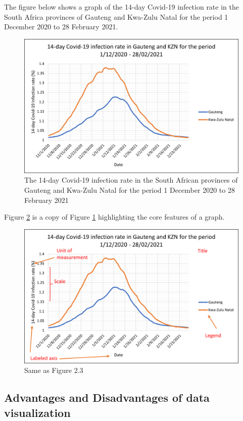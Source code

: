 \documentclass[
]{book}
\begin{document}
The figure below shows a graph of the 14-day Covid-19 infection rate in the South Africa provinces of Gauteng and Kwa-Zulu Natal for the period 1 December 2020 to 28 February 2021.

\begin{figure}

{\centering \includegraphics[width=0.7\linewidth]{Figures-Chapter1/Covid-1} 

}

\caption{The 14-day Covid-19 infection rate in the South African provinces of Gauteng and Kwa-Zulu Natal for the period 1 December 2020 to 28 February 2021}\label{fig:covid-1}
\end{figure}

Figure \ref{fig:covid-2} is a copy of Figure \ref{fig:covid-1} highlighting the core features of a graph.

\begin{figure}

{\centering \includegraphics[width=0.7\linewidth]{Figures-Chapter1/Covid-2} 

}

\caption{Same as Figure 2.3}\label{fig:covid-2}
\end{figure}

\subsection{Advantages and Disadvantages of data visualization}\label{advantages-and-disadvantages-of-data-visualization}
\end{document}
